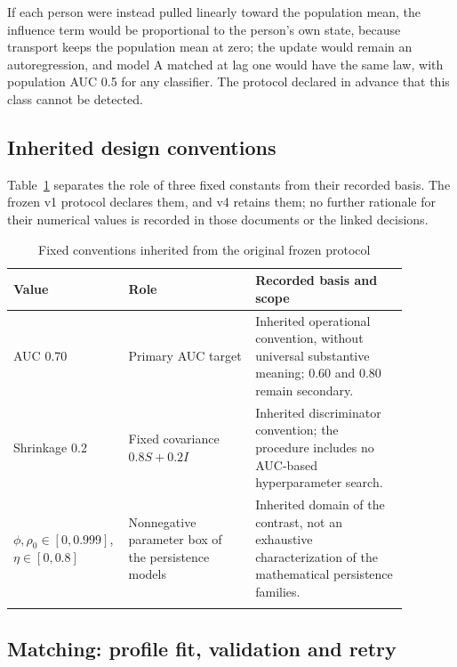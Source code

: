 If each person were instead pulled linearly toward the population mean, the influence term would be proportional to the person's own state, because transport keeps the population mean at zero; the update would remain an autoregression, and model A matched at lag one would have the same law, with population AUC 0.5 for any classifier. The protocol declared in advance that this class cannot be detected.

\subsection{Inherited design conventions}\label{sec:dd-conventions}

Table~\ref{tab:design-conventions} separates the role of three fixed constants from their recorded basis. The frozen v1 protocol declares them, and v4 retains them; no further rationale for their numerical values is recorded in those documents or the linked decisions.
\begin{table}[h]
\caption{Fixed conventions inherited from the original frozen protocol}\label{tab:design-conventions}
\begin{tabular}{@{}p{0.22\linewidth}p{0.30\linewidth}p{0.36\linewidth}@{}}
\toprule
Value & Role & Recorded basis and scope \\
\midrule
AUC 0.70 & Primary AUC target & Inherited operational convention, without universal substantive meaning; 0.60 and 0.80 remain secondary. \\
Shrinkage 0.2 & Fixed covariance $0.8S+0.2I$ & Inherited discriminator convention; the procedure includes no AUC-based hyperparameter search. \\
$\phi,\rho_0\in[0,0.999]$, $\eta\in[0,0.8]$ & Nonnegative parameter box of the persistence models & Inherited domain of the contrast, not an exhaustive characterization of the mathematical persistence families. \\
\botrule
\end{tabular}
\end{table}

\subsection{Matching: profile fit, validation and retry}\label{sec:dd-matching}

